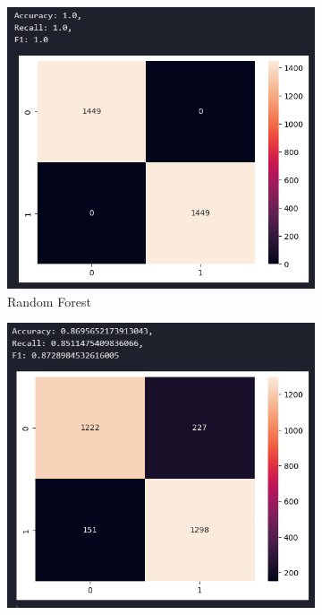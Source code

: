 \documentclass[12pt]{report}
\begin{document}
\begin{figure}[H]
    \centering
    \begin{subfigure}[b]{0.3\textwidth}
        \includegraphics[width=\textwidth]{ModelDev/Iteration1/Matrices/Seen/MetricsIncluded/RF.png}
        \caption{Random Forest}
        \label{fig:RFSeen}
    \end{subfigure}
    \hfill
    \begin{subfigure}[b]{0.3\textwidth}
        \includegraphics[width=\textwidth]{ModelDev/Iteration1/Matrices/Seen/MetricsIncluded/SVC.png}

\end{subfigure}
\end{figure}
\end{document}
